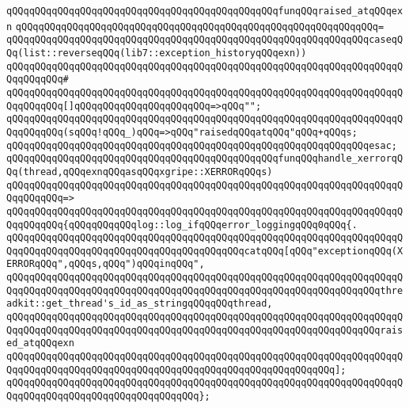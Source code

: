 \newline
\verb|qQQqqQQqqQQqqQQqqQQqqQQqqQQqqQQqqQQqqQQqqQQqqQQqfunqQQqraised_atqQQqexn|\newline
\verb|qQQqqQQqqQQqqQQqqQQqqQQqqQQqqQQqqQQqqQQqqQQqqQQqqQQqqQQqqQQqqQQq=|\newline
\verb|qQQqqQQqqQQqqQQqqQQqqQQqqQQqqQQqqQQqqQQqqQQqqQQqqQQqqQQqqQQqqQQqcaseqQQq(list::reverseqQQq(lib7::exception_historyqQQqexn))|\newline
\verb|qQQqqQQqqQQqqQQqqQQqqQQqqQQqqQQqqQQqqQQqqQQqqQQqqQQqqQQqqQQqqQQqqQQqqQQqqQQqqQQq#|\newline
\verb|qQQqqQQqqQQqqQQqqQQqqQQqqQQqqQQqqQQqqQQqqQQqqQQqqQQqqQQqqQQqqQQqqQQqqQQqqQQqqQQq[]qQQqqQQqqQQqqQQqqQQqqQQq=>qQQq"";|\newline
\verb|qQQqqQQqqQQqqQQqqQQqqQQqqQQqqQQqqQQqqQQqqQQqqQQqqQQqqQQqqQQqqQQqqQQqqQQqqQQqqQQq(sqQQq!qQQq_)qQQq=>qQQq"raisedqQQqatqQQq"qQQq+qQQqs;|\newline
\verb|qQQqqQQqqQQqqQQqqQQqqQQqqQQqqQQqqQQqqQQqqQQqqQQqqQQqqQQqqQQqqQQqesac;|\newline
\newline
\verb|qQQqqQQqqQQqqQQqqQQqqQQqqQQqqQQqqQQqqQQqqQQqqQQqfunqQQqhandle_xerrorqQQq(thread,qQQqexnqQQqasqQQqxgripe::XERRORqQQqs)|\newline
\verb|qQQqqQQqqQQqqQQqqQQqqQQqqQQqqQQqqQQqqQQqqQQqqQQqqQQqqQQqqQQqqQQqqQQqqQQqqQQqqQQq=>|\newline
\verb|qQQqqQQqqQQqqQQqqQQqqQQqqQQqqQQqqQQqqQQqqQQqqQQqqQQqqQQqqQQqqQQqqQQqqQQqqQQqqQQq{qQQqqQQqqQQqlog::log_ifqQQqerror_loggingqQQq0qQQq{.|\newline
\verb|qQQqqQQqqQQqqQQqqQQqqQQqqQQqqQQqqQQqqQQqqQQqqQQqqQQqqQQqqQQqqQQqqQQqqQQqqQQqqQQqqQQqqQQqqQQqqQQqqQQqqQQqqQQqqQQqcatqQQq[qQQq"exceptionqQQq(XERRORqQQq",qQQqs,qQQq")qQQqinqQQq",|\newline
\verb|qQQqqQQqqQQqqQQqqQQqqQQqqQQqqQQqqQQqqQQqqQQqqQQqqQQqqQQqqQQqqQQqqQQqqQQqqQQqqQQqqQQqqQQqqQQqqQQqqQQqqQQqqQQqqQQqqQQqqQQqqQQqqQQqqQQqqQQqthreadkit::get_thread's_id_as_stringqQQqqQQqthread,|\newline
\verb|qQQqqQQqqQQqqQQqqQQqqQQqqQQqqQQqqQQqqQQqqQQqqQQqqQQqqQQqqQQqqQQqqQQqqQQqqQQqqQQqqQQqqQQqqQQqqQQqqQQqqQQqqQQqqQQqqQQqqQQqqQQqqQQqqQQqqQQqraised_atqQQqexn|\newline
\verb|qQQqqQQqqQQqqQQqqQQqqQQqqQQqqQQqqQQqqQQqqQQqqQQqqQQqqQQqqQQqqQQqqQQqqQQqqQQqqQQqqQQqqQQqqQQqqQQqqQQqqQQqqQQqqQQqqQQqqQQqqQQqqQQq];|\newline
\verb|qQQqqQQqqQQqqQQqqQQqqQQqqQQqqQQqqQQqqQQqqQQqqQQqqQQqqQQqqQQqqQQqqQQqqQQqqQQqqQQqqQQqqQQqqQQqqQQqqQQqqQQq};|\newline
